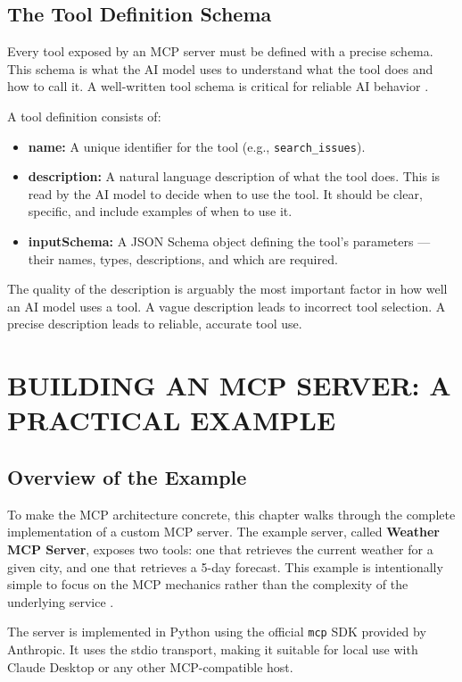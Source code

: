 \section{The Tool Definition Schema}
Every tool exposed by an MCP server must be defined with a precise schema. This schema is what the AI model uses to understand what the tool does and how to call it. A well-written tool schema is critical for reliable AI behavior \cite{anthropic2024mcp}.

A tool definition consists of:
\begin{itemize}
    \item \textbf{name:} A unique identifier for the tool (e.g., \texttt{search\_issues}).
    \item \textbf{description:} A natural language description of what the tool does. This is read by the AI model to decide when to use the tool. It should be clear, specific, and include examples of when to use it.
    \item \textbf{inputSchema:} A JSON Schema object defining the tool's parameters — their names, types, descriptions, and which are required.
\end{itemize}

The quality of the description is arguably the most important factor in how well an AI model uses a tool. A vague description leads to incorrect tool selection. A precise description leads to reliable, accurate tool use.

\chapter{BUILDING AN MCP SERVER: A PRACTICAL EXAMPLE}

\section{Overview of the Example}
To make the MCP architecture concrete, this chapter walks through the complete implementation of a custom MCP server. The example server, called \textbf{Weather MCP Server}, exposes two tools: one that retrieves the current weather for a given city, and one that retrieves a 5-day forecast. This example is intentionally simple to focus on the MCP mechanics rather than the complexity of the underlying service \cite{anthropic2024mcp}.

The server is implemented in Python using the official \texttt{mcp} SDK provided by Anthropic. It uses the stdio transport, making it suitable for local use with Claude Desktop or any other MCP-compatible host.

